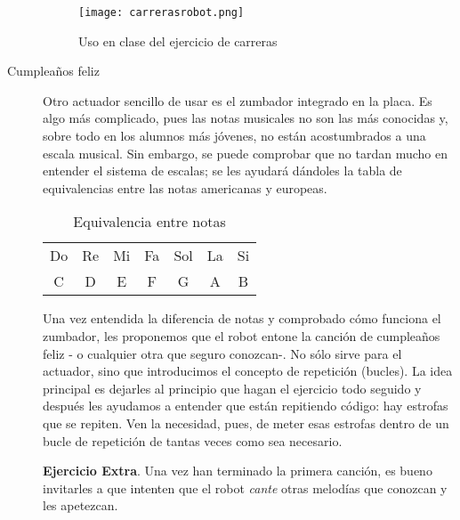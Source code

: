 \begin{description}
\begin{figure}[H]
	\centering
	\texttt{[image: carrerasrobot.png]}
	\label{img:carrerasrobot}
	\caption{Uso en clase del ejercicio de carreras}
\end{figure}
\item [Cumpleaños feliz]\label{ej:cumple}
Otro actuador sencillo de usar es el zumbador integrado en la placa. Es algo más complicado, pues las notas musicales no son las más conocidas y, sobre todo en los alumnos más jóvenes, no están acostumbrados a una escala musical. Sin embargo, se puede comprobar que no tardan mucho en entender el sistema de escalas; se les ayudará dándoles la tabla de equivalencias entre las notas americanas y europeas.
\begin{table}[H]\centering
	\begin{tabular}{||ccccccc||}
		\hline
		Do & Re & Mi & Fa & Sol & La & Si \\[1.5pt]
		C & D & E & F & G & A & B \\
		\hline
	\end{tabular}
	\caption{Equivalencia entre notas}
\end{table}

Una vez entendida la diferencia de notas y comprobado cómo funciona el zumbador, les proponemos que el robot entone la canción de cumpleaños feliz - o cualquier otra 	que seguro conozcan-. No sólo sirve para el actuador, sino que introducimos el concepto de repetición (bucles). La idea principal es dejarles al principio que hagan el ejercicio todo seguido y después les ayudamos a entender que están repitiendo código: hay estrofas que se repiten. Ven la necesidad, pues, de meter esas estrofas dentro de un bucle de repetición de tantas veces como sea necesario.

\textbf{Ejercicio Extra}. Una vez han terminado la primera canción, es bueno invitarles a que intenten que el robot \textit{cante} otras melodías que conozcan y les apetezcan.


\end{description}
